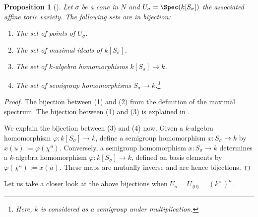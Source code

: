 \documentclass[12pt]{amsart}
\theoremstyle{plain}
\newtheorem{proposition}[theorem]{Proposition}
\theoremstyle{definition}
\begin{document}
\begin{proposition}[{\cite[Proposition 1.3.1]{CLS11}}]\label{proposition:pointbijections}
Let $\sigma$ be a cone in $N$ and $U_\sigma = \Spec(k[S_\sigma])$ the associated affine toric variety.
The following sets are in bijection:
\begin{enumerate}
\item The set of points of $U_\sigma$.
\item The set of maximal ideals of $k[S_\sigma]$.
\item The set of $k$-algebra homomorphisms $k[S_\sigma] \to k$.
\item The set of semigroup homomorphisms $S_\sigma \to k$.\footnote{Here, $k$ is considered as a semigroup under multiplication.}
\end{enumerate}
\end{proposition}

\begin{proof}
The bijection between (1) and (2) from the definition of the maximal spectrum.
The bijection between (1) and (3) is explained in \cite[3.28]{Milne13}.

We explain the bijection between (3) and (4) now.
Given a $k$-algebra homomorphism $\varphi : k[S_\sigma] \to k$, define a semigroup homomorphism $x : S_\sigma \to k$ by $x(u) := \varphi(\chi^u)$.
Conversely, a semigroup homomorphism $x : S_\sigma \to k$ determines a $k$-algebra homomorphism $\varphi : k[S_\sigma] \to k$, defined on basis elements by $\varphi(\chi^u) := x(u)$.
These maps are mutually inverse and are hence bijections.
\end{proof}

Let us take a closer look at the above bijections when $U_\sigma = U_{\{0\}} = (k^\times)^n$.
\end{document}
